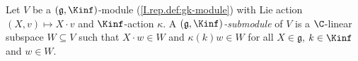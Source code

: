 Let $V$ be a $(\mathfrak g,\Kinf)$-module (\cref{I.rep.def:gk-module}) with Lie action $(X,v)\mapsto X\cdot v$ and
$\Kinf$-action $\kappa$. A \emph{$(\mathfrak g,\Kinf)$-submodule} of $V$ is a $\C$-linear subspace $W\subseteq V$ such that
$X\cdot w\in W$ and $\kappa(k)w\in W$ for all $X\in\mathfrak g$, $k\in\Kinf$ and $w\in W$.
